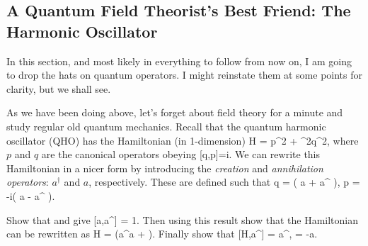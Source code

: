 \subsection{A Quantum Field Theorist's Best Friend: The Harmonic Oscillator}

\bnn 
    In this section, and most likely in everything to follow from now on, I am going to drop the hats on quantum operators. I might reinstate them at some points for clarity, but we shall see. 
\enn 

As we have been doing above, let's forget about field theory for a minute and study regular old quantum mechanics. Recall that the quantum harmonic oscillator (QHO) has the Hamiltonian (in 1-dimension)
\be
\label{eqn:QHOHamiltonian}
    H = p^2 + \omega^2q^2,
\ee 
where $p$ and $q$ are the canonical operators obeying 
\be 
\label{eqn:pqcommutator}
    [q,p]=i.
\ee 
We can rewrite this Hamiltonian in a nicer form by introducing the \textit{creation} and \textit{annihilation operators}: $a^{\dagger}$ and $a$, respectively. These are defined such that 
\be 
\label{eqn:qpcreationannihilation}
    q = \big( a + a^{\dagger} \big), \qand p = -i\big( a - a^{\dagger} \big).
\ee 

\bbox
    Show that  and  give 
    \be 
    \label{eqn:creationqpcreationannihilationcommutator}
        [a,a^{\dagger}] = 1.
    \ee 
    Then using this result show that the Hamiltonian  can be rewritten as 
    \be
    \label{eqn:QHOHamiltonianaadagger}
        H = \omega\bigg(a^{\dagger}a + \bigg).
    \ee 
    Finally show that 
    \be 
    \label{eqn:HaadaggerCommutation}
        [H,a^{\dagger}] = \omega a^{\dagger}, \qand [H,a] = -\omega a.
    \ee 
\ebox

